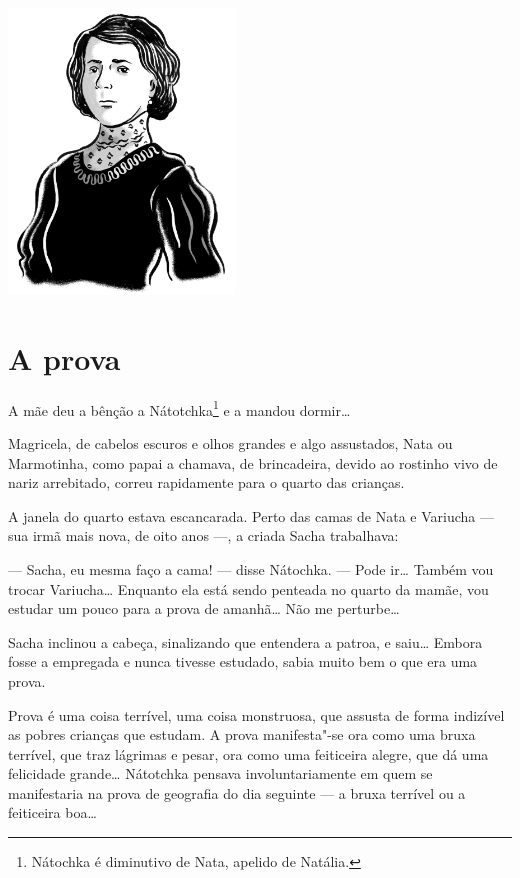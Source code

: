 \pagebreak
\thispagestyle{empty}
\mbox{}
\vfill
\begin{center}
\includegraphics[width=6cm]{./imgs/autor10.jpg}
\end{center}


\chapter{A prova}

A mãe deu a bênção a Nátotchka\footnote{Nátochka é diminutivo de
  Nata, apelido de Natália.} e a mandou dormir\ldots{}

Magricela, de cabelos escuros e olhos grandes e algo assustados, Nata ou
Marmotinha, como papai a chamava, de brincadeira, devido ao rostinho
vivo de nariz arrebitado, correu rapidamente para o quarto das crianças.

A janela do quarto estava escancarada. Perto das camas de Nata e
Variucha --- sua irmã mais nova, de oito anos ---, a criada Sacha
trabalhava:

--- Sacha, eu mesma faço a cama! --- disse Nátochka. --- Pode ir\ldots{}
Também vou trocar Variucha\ldots{} Enquanto ela está sendo penteada no quarto
da mamãe, vou estudar um pouco para a prova de amanhã\ldots{} Não me
perturbe\ldots{}

Sacha inclinou a cabeça, sinalizando que entendera a patroa, e saiu\ldots{}
Embora fosse a empregada e nunca tivesse estudado, sabia muito bem o que
era uma prova.

Prova é uma coisa terrível, uma coisa monstruosa, que assusta de forma
indizível as pobres crianças que estudam. A prova manifesta"-se ora como
uma bruxa terrível, que traz lágrimas e pesar, ora como uma feiticeira
alegre, que dá uma felicidade grande\ldots{} Nátotchka pensava
involuntariamente em quem se manifestaria na prova de geografia do dia
seguinte --- a bruxa terrível ou a feiticeira boa\ldots{}

